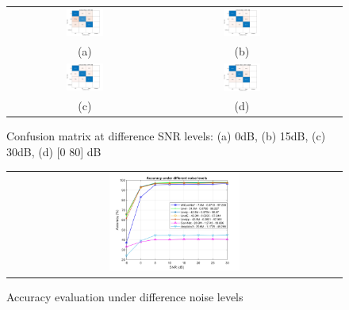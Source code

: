 \documentclass[journal]{IEEEtran} %
\begin{document}
\begin{figure}[!h]
    \centering
    \footnotesize
    \begin{tabular}{cccc}
        \includegraphics[width=0.25\textwidth]{img/confusion_matrix_0dB.jpg} & 
        \includegraphics[width=0.25\textwidth]{img/confusion_matrix_15dB.jpg} & \\ (a) & (b) \\
        \includegraphics[width=0.25\textwidth]{img/confusion_matrix_30dB.jpg} & 
        \includegraphics[width=0.25\textwidth]{img/confusion_matrix_alldB.jpg} & \\ (c) & (d)
    \end{tabular}
    \caption{Confusion matrix at difference SNR levels: (a) 0dB, (b) 15dB, (c) 30dB, (d) [0 80] dB}
    \label{fig5}
\end{figure}

\begin{figure}[!h]
    \centering
    \footnotesize
    \begin{tabular}{c}
        \includegraphics[width=0.4\textwidth]{img/accuracy_SNRs.jpg}
    \end{tabular}
    \caption{Accuracy evaluation under difference noise levels}
    \label{fig6}
\end{figure}
\end{document}
